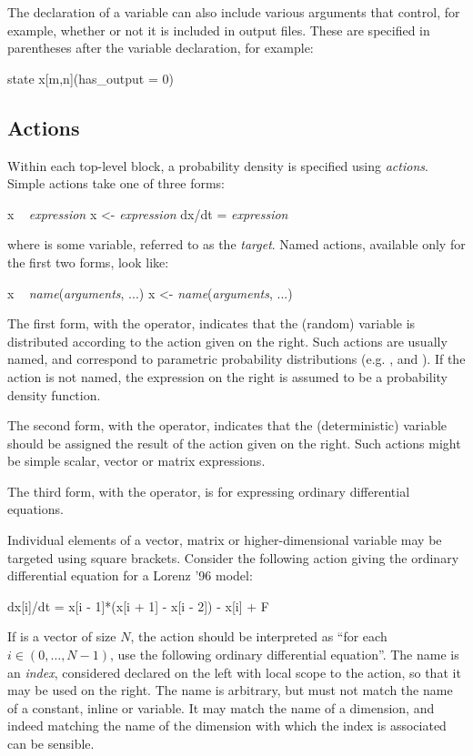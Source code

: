The declaration of a variable can also include various arguments that control,
for example, whether or not it is included in output files. These are
specified in parentheses after the variable declaration, for example:
\begin{bicode}
state x[m,n](has_output = 0)
\end{bicode}

\subsection{Actions\label{Actions}}

Within each top-level block, a probability density is specified using
\emph{actions}. Simple actions take one of three forms:
\begin{bicode}
x ~ \textsl{expression}
x <- \textsl{expression}
dx/dt = \textsl{expression}
\end{bicode}
where  is some variable, referred to as the \emph{target}. Named
actions, available only for the first two forms, look like:
\begin{bicode}
x ~ \textsl{name}(\textsl{arguments}, ...)
x <- \textsl{name}(\textsl{arguments}, ...)
\end{bicode}

The first form, with the \bitt{\~{}} operator, indicates that the (random)
variable  is distributed according to the action given on the
right. Such actions are usually named, and correspond to parametric
probability distributions (e.g.  ,  and
). If the action is not named, the expression on the right
is assumed to be a probability density function.

The second form, with the \bitt{<-} operator, indicates that the
(deterministic) variable  should be assigned the result of the action
given on the right. Such actions might be simple scalar,
vector or matrix expressions.

The third form, with the \bitt{=} operator, is for expressing ordinary
differential equations.

Individual elements of a vector, matrix or higher-dimensional variable may be
targeted using square brackets. Consider the following action giving the
ordinary differential equation for a
Lorenz '96 model:
\begin{bicode}
dx[i]/dt = x[i - 1]*(x[i + 1] - x[i - 2]) - x[i] + F
\end{bicode}
If  is a vector of size $N$, the action should be interpreted as ``for
each $i \in (0,\ldots,N-1)$, use the following ordinary differential
equation''. The name  is an \emph{index}, considered declared on the
left with local scope to the action, so that it may be used on the right. The
name  is arbitrary, but must not match the name of a constant, inline
or variable. It may match the name of a dimension, and indeed matching the
name of the dimension with which the index is associated can be sensible.

